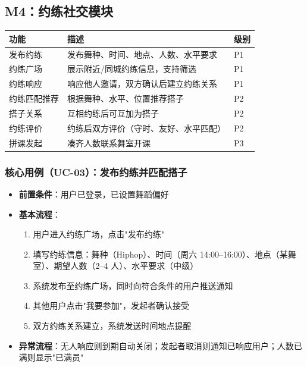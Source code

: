 \documentclass[12pt,a4paper]{ctexart}
\begin{document}
\subsection{M4：约练社交模块}

\begin{table}[H]
\centering
\begin{tabularx}{\textwidth}{L{3cm}X C{0.8cm}}
\toprule
\textbf{功能} & \textbf{描述} & \textbf{级别} \\
\midrule
发布约练 & 发布舞种、时间、地点、人数、水平要求 & P1 \\
约练广场 & 展示附近/同城约练信息，支持筛选 & P1 \\
约练响应 & 响应他人邀请，双方确认后建立约练关系 & P1 \\
约练匹配推荐 & 根据舞种、水平、位置推荐搭子 & P2 \\
搭子关系 & 互相约练后可互加为搭子 & P2 \\
约练评价 & 约练后双方评价（守时、友好、水平匹配） & P2 \\
拼课发起 & 凑齐人数联系舞室开课 & P3 \\
\bottomrule
\end{tabularx}
\end{table}

\subsubsection{核心用例（UC-03）：发布约练并匹配搭子}

\begin{itemize}
    \item \textbf{前置条件}：用户已登录，已设置舞蹈偏好
    \item \textbf{基本流程}：
    \begin{enumerate}
        \item 用户进入约练广场，点击"发布约练"
        \item 填写约练信息：舞种（Hiphop）、时间（周六 14:00--16:00）、地点（某舞室）、期望人数（2--4 人）、水平要求（中级）
        \item 系统发布至约练广场，同时向符合条件的用户推送通知
        \item 其他用户点击"我要参加"，发起者确认接受
        \item 双方约练关系建立，系统发送时间地点提醒
    \end{enumerate}
    \item \textbf{异常流程}：无人响应则到期自动关闭；发起者取消则通知已响应用户；人数已满则显示"已满员"
\end{itemize}
\end{document}
